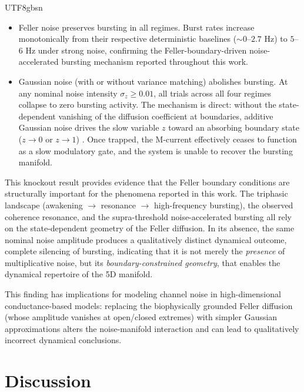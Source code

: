 ﻿\documentclass[reprint, amsmath, amssymb, aps, pre]{revtex4-2}
\begin{document}
\begin{CJK*}{UTF8}{gbsn}
\begin{itemize}
    \item Feller noise preserves bursting in all regimes. Burst rates increase monotonically from their respective deterministic baselines ($\sim 0$--$2.7$ Hz) to $5$--$6$ Hz under strong noise, confirming the Feller-boundary-driven noise-accelerated bursting mechanism reported throughout this work.
    
    \item Gaussian noise (with or without variance matching) abolishes bursting. At any nominal noise intensity $\sigma_z \geq 0.01$, all trials across all four regimes collapse to zero bursting activity. The mechanism is direct: without the state-dependent vanishing of the diffusion coefficient at boundaries, additive Gaussian noise drives the slow variable $z$ toward an absorbing boundary state ($z \to 0$ or $z \to 1$) \cite{goldwyn2011what}. Once trapped, the M-current effectively ceases to function as a slow modulatory gate, and the system is unable to recover the bursting manifold.
\end{itemize}

This knockout result provides evidence that the Feller boundary conditions are structurally important for the phenomena reported in this work. The triphasic landscape (awakening $\to$ resonance $\to$ high-frequency bursting), the observed coherence resonance, and the supra-threshold noise-accelerated bursting all rely on the state-dependent geometry of the Feller diffusion. In its absence, the same nominal noise amplitude produces a qualitatively distinct dynamical outcome, complete silencing of bursting, indicating that it is not merely the \textit{presence} of multiplicative noise, but its \textit{boundary-constrained geometry}, that enables the dynamical repertoire of the 5D manifold.

This finding has implications for modeling channel noise in high-dimensional conductance-based models: replacing the biophysically grounded Feller diffusion (whose amplitude vanishes at open/closed extremes) with simpler Gaussian approximations alters the noise-manifold interaction and can lead to qualitatively incorrect dynamical conclusions.

\section{Discussion}
\label{sec:discussion}


\end{CJK*}
\end{document}

